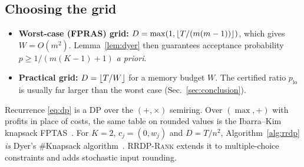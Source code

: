 \subsection{Choosing the grid}
\begin{itemize}[nosep]
\item \textbf{Worst-case (FPRAS) grid:} $D=\max(1,\lfloor T/(m(m-1))\rfloor)$, which gives $W=O(m^2)$. Lemma~\ref{lem:dyer} then guarantees acceptance
      probability $p\ge1/(m(K-1)+1)$ \emph{a priori}.
\item \textbf{Practical grid:} $D=\lfloor T/W\rfloor$ for a memory budget $W$. The certified ratio $p_{\mathrm{lo}}$ is usually far larger
      than the worst case (Sec.~\ref{sec:conclusion}).
\end{itemize}

\begin{remark}
Recurrence \eqref{eq:dp} is a DP over the $(+,\times)$ semiring. Over $(\max,+)$ with
profits in place of costs, the same table on rounded values is the Ibarra--Kim knapsack
FPTAS~\cite{ibarra1975}. For $K=2$, $c_j=(0,w_j)$ and $D=T/n^2$, Algorithm~\ref{alg:rrdp} \emph{is}
Dyer's \#Knapsack algorithm~\cite{dyer2003}. \textsc{RRDP-Rank} extends it to multiple-choice
constraints and adds stochastic input rounding.
\end{remark}
